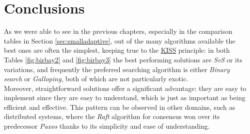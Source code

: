 \chapter{Conclusions\label{conclusions}}

As we were able to see in the previous chapters, especially in the comparison tables in Section \ref{sec:smalladaptive}, out of the many algorithms available the best ones are often the simplest, keeping true to the \href{https://en.wikipedia.org/wiki/KISS_principle}{KISS} principle: in both Tables \ref{fig:birbay2} and \ref{fig:birbay3} the best performing solutions are \textit{SvS} or its variations, and frequently the preferred searching algorithm is either \textit{Binary search} or \textit{Galloping}, both of which are not particularly exotic. \\
Moreover, straightforward solutions offer a significant advantage: they are easy to implement since they are easy to understand, which is just as important as being efficient and effective. This pattern can be observed in other domains, such as distributed systems, where the \textit{Raft} algorithm for consensus \citep{raft} won over its predecessor \textit{Paxos} \citep{paxos} thanks to its simplicity and ease of understanding. 

